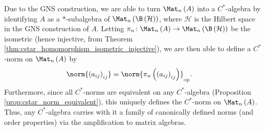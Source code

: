 Due to the GNS construction, we are able to turn $\Mat_n\left( A \right)$ into a $C^{\ast}$-algebra by identifying $A$ as a $\ast$-subalgebra of $\Mat_n\left( \B\left( \mathcal{H} \right) \right)$, where $\mathcal{H}$ is the Hilbert space in the GNS construction of $A$. Letting $\pi_{n}\colon \Mat_n\left( A \right)\rightarrow \Mat_n\left( \B\left( \mathcal{H} \right) \right)$ be the isometric (hence injective, from Theorem \ref{thm:cstar_homomorphism_isometric_injective}), we are then able to define a $C^{\ast}$-norm on $\Mat_n\left( A \right)$ by
\begin{align*}
  \norm{\left( a_{ij} \right)_{ij}} &= \norm{\pi_n\left( \left( a_{ij} \right)_{ij} \right)}_{\op}.
\end{align*}
Furthermore, since all $C^{\ast}$-norms are equivalent on any $C^{\ast}$-algebra (Proposition \ref{prop:cstar_norm_equivalent}), this uniquely defines the $C^{\ast}$-norm on $\Mat_n\left( A \right)$. Thus, any $C^{\ast}$-algebra carries with it a family of canonically defined norms (and order properties) via the amplification to matrix algebras.

